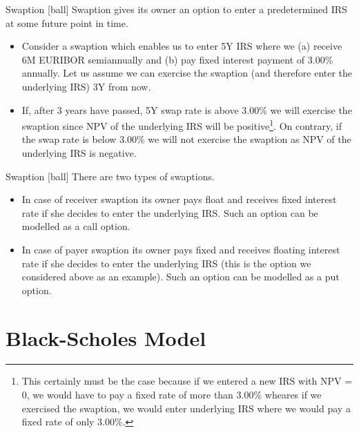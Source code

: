 \documentclass{beamer}
\begin{document}
\begin{frame}{Swaption}
[ball]
Swaption gives its owner an option to enter a predetermined IRS at some future point in time.
\begin{itemize}
	\item Consider a swaption which enables us to enter 5Y IRS where we (a) receive 6M EURIBOR semiannually and (b) pay fixed interest payment of 3.00\% annually. Let us assume we can exercise the swaption (and therefore enter the underlying IRS) 3Y from now.
	\item If, after 3 years have passed, 5Y swap rate is above 3.00\% we will exercise the swaption since NPV of the underlying IRS will be positive\footnote{\tiny{This certainly must be the case because if we entered a new IRS with NPV = 0, we would have to pay a fixed rate of more than 3.00\% wheares if we exercised the swaption, we would enter underlying IRS where we would pay a fixed rate of only 3.00\%.}}. On contrary, if the swap rate is below 3.00\% we will not exercise the swaption as NPV of the underlying IRS is negative.
\end{itemize}
\end{frame}

\begin{frame}{Swaption}
[ball]
There are two types of swaptions.
\begin{itemize}
	\item In case of receiver swaption its owner pays float and receives fixed interest rate if she decides to enter the underlying IRS. Such an option can be modelled as a call option.
	\item In case of payer swaption its owner pays fixed and receives floating interest rate if she decides to enter the underlying IRS (this is the option we considered above as an example). Such an option can be modelled as a put option.
\end{itemize}
\end{frame}

\section{Black-Scholes Model}
\end{document}
